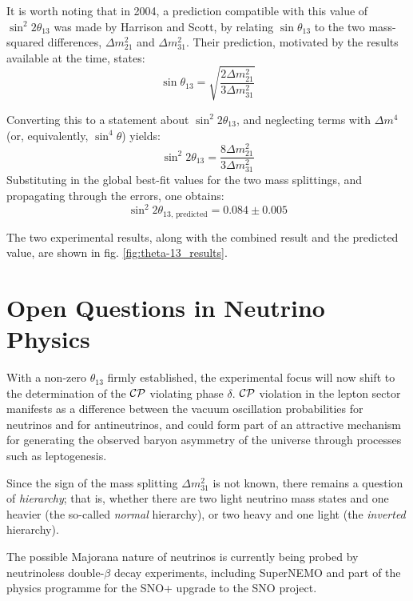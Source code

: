 It is worth noting that in 2004, a prediction compatible with this value of $\sin^2 2\theta_{13}$ was made by Harrison and Scott, by relating $\sin\theta_{13}$ to the two mass-squared differences, $\Delta m^2_{21}$ and $\Delta m^2_{31}$\citep{Harrison2004}. Their prediction, motivated by the results available at the time, states:
\begin{equation}\label{eqn:theta_13_prediction}
\sin \theta_{13} = \sqrt{\frac{2\Delta m^2_{21}}{3\Delta m^2_{31}}}
\end{equation}

Converting this to a statement about $\sin^2 2\theta_{13}$, and neglecting terms with $\Delta m^4$ (or, equivalently, $\sin^4 \theta$) yields:
\begin{equation}\label{eqn:sin2_2theta_13_prediction}
\sin^2 2\theta_{13} = \frac{8 \Delta m^2_{21}}{3 \Delta m^2_{31}}
\end{equation}
Substituting in the global best-fit values for the two mass splittings, and propagating through the errors, one obtains:
\begin{equation}\label{eqn:prediction_sin2_2theta_13}
\sin^2 2\theta_{13,\,\mathrm{predicted}} = 0.084 \pm 0.005
\end{equation}

The two experimental results, along with the combined result and the predicted value, are shown in fig. \ref{fig:theta-13_results}.

\section{Open Questions in Neutrino Physics}
With a non-zero $\theta_{13}$ firmly established, the experimental focus will now shift to the determination of the $\mathcal{C}\mathcal{P}$ violating phase $\delta$. $\mathcal{C}\mathcal{P}$ violation in the lepton sector manifests as a difference between the vacuum oscillation probabilities for neutrinos and for antineutrinos, and could form part of an attractive mechanism for generating the observed baryon asymmetry of the universe through processes such as leptogenesis\citep{Riotto1999}.

Since the sign of the mass splitting $\Delta m^2_{31}$ is not known, there remains a question of \emph{hierarchy}; that is, whether there are two light neutrino mass states and one heavier (the so-called \emph{normal} hierarchy), or two heavy and one light (the \emph{inverted} hierarchy). 

The possible Majorana nature of neutrinos is currently being probed by neutrinoless double-$\beta$ decay experiments, including SuperNEMO\citep{SuperNEMO} and part of the physics programme for the SNO+ upgrade\citep{SNO+} to the SNO project.
